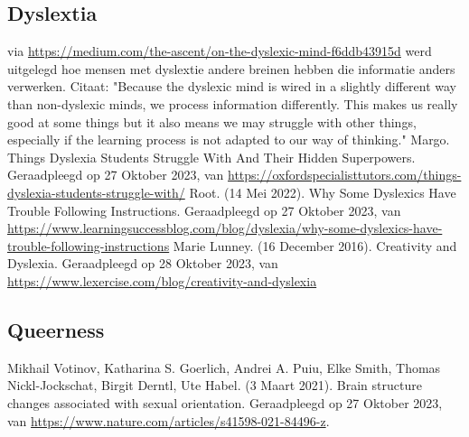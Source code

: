 \documentclass{article}
\begin{document}
\begin{thebibliography}{9}
        \item\subsection*{Dyslextia}
                via \url{https://medium.com/the-ascent/on-the-dyslexic-mind-f6ddb43915d} werd uitgelegd hoe mensen met dyslextie andere breinen hebben die informatie anders verwerken. Citaat: "Because the dyslexic mind is wired in a slightly different way than non-dyslexic minds, we process information differently. This makes us really good at some things but it also means we may struggle with other things, especially if the learning process is not adapted to our way of thinking."    
                Margo. Things Dyslexia Students Struggle With And Their Hidden Superpowers.  Geraadpleegd op 27 Oktober 2023, van \url{https://oxfordspecialisttutors.com/things-dyslexia-students-struggle-with/}
                Root. (14 Mei 2022). Why Some Dyslexics Have Trouble Following Instructions. Geraadpleegd op 27 Oktober 2023, van \url{https://www.learningsuccessblog.com/blog/dyslexia/why-some-dyslexics-have-trouble-following-instructions}
                Marie Lunney. (16 December 2016). Creativity and Dyslexia. Geraadpleegd op 28 Oktober 2023, van \url{https://www.lexercise.com/blog/creativity-and-dyslexia}

        \item\subsection*{Queerness}
                Mikhail Votinov, Katharina S. Goerlich, Andrei A. Puiu, Elke Smith, Thomas Nickl-Jockschat, Birgit Derntl, Ute Habel. (3 Maart 2021). Brain structure changes associated with sexual orientation. Geraadpleegd op 27 Oktober 2023, van \url{https://www.nature.com/articles/s41598-021-84496-z}.


\end{thebibliography}
\end{document}
